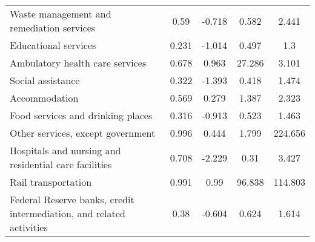 \begin{table}[H]
\begin{center}
\begin{tabular}{lcccc}
Waste management and remediation services & 0.59 & -0.718 & 0.582 & 2.441 \\
Educational services & 0.231 & -1.014 & 0.497 & 1.3 \\
Ambulatory health care services & 0.678 & 0.963 & 27.286 & 3.101 \\
Social assistance & 0.322 & -1.393 & 0.418 & 1.474 \\
Accommodation & 0.569 & 0.279 & 1.387 & 2.323 \\
Food services and drinking places & 0.316 & -0.913 & 0.523 & 1.463 \\
Other services, except government & 0.996 & 0.444 & 1.799 & 224.656 \\
Hospitals and nursing and residential care facilities & 0.708 & -2.229 & 0.31 & 3.427 \\
Rail transportation & 0.991 & 0.99 & 96.838 & 114.803 \\
Federal Reserve banks, credit intermediation, and related activities & 0.38 & -0.604 & 0.624 & 1.614 \\
\end{tabular}
\end{center}
\end{table}